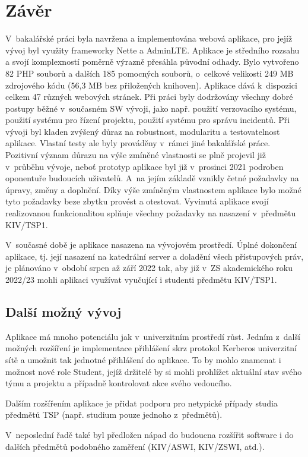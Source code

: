\documentclass[czech,BP]{thesiskiv}
\begin{document}
\chapter{Závěr}
	\par V~bakalářské práci byla navržena a implementována webová aplikace, pro jejíž vývoj byl využity frameworky Nette a AdminLTE.
	Aplikace je středního rozsahu a svojí komplexností poměrně výrazně přesáhla původní odhady. Bylo vytvořeno 82 PHP souborů a dalších 185 pomocných souborů, o~celkové velikosti 249 MB zdrojového kódu (56,3 MB bez přiložených knihoven). Aplikace dává k~dispozici celkem 47 různých webových stránek.
	Při práci byly dodržovány všechny dobré postupy běžné v~současném SW vývoji, jako např. použití verzovacího systému, použití systému pro řízení projektu, použití systému pro správu incidentů. 
	Při vývoji byl kladen zvýšený důraz na robustnost, modularitu a testovatelnost aplikace. Vlastní testy ale byly prováděny v~rámci jiné bakalářské práce. Pozitivní význam důrazu na výše zmíněné vlastnosti se plně projevil již v~průběhu vývoje, neboť prototyp aplikace byl již v~prosinci 2021 podroben oponentuře budoucích uživatelů. A~na jejím základě vznikly četné požadavky na úpravy, změny a doplnění. Díky výše zmíněným vlastnostem aplikace bylo možné tyto požadavky beze zbytku provést a otestovat.
	Vyvinutá aplikace svojí realizovanou funkcionalitou splňuje všechny požadavky na nasazení v~předmětu KIV/TSP1.
	
	V~současné době je aplikace nasazena na vývojovém prostředí. Úplné dokončení aplikace, tj. její nasazení na katedrální server a doladění všech přístupových práv, je plánováno v~období srpen až září 2022 tak, aby již v~ZS akademického roku 2022/23 mohli aplikaci využívat vyučující i studenti předmětu KIV/TSP1.
	\section{Další možný vývoj}
	\par Aplikace má mnoho potenciálu jak v~univerzitním prostředí růst. Jedním z~další možných rozšíření je implementace přihlášení skrz protokol Kerberos univerzitní sítě a umožnit tak jednotné přihlášení do aplikace. To by mohlo znamenat i možnost nové role Student, jejíž držitelé by si mohli prohlížet aktuální stav svého týmu a projektu a případně kontrolovat akce svého vedoucího.
	\par Dalším rozšířením aplikace je přidat podporu pro netypické případy studia předmětů TSP (např. studium pouze jednoho z~předmětů).
	\par V~neposlední řadě také byl předložen nápad do budoucna rozšířit software i do dalších předmětů podobného zaměření (KIV/ASWI, KIV/ZSWI, atd.).
\listoffigures
%
%
\lstlistoflistings
% 
\end{document}
